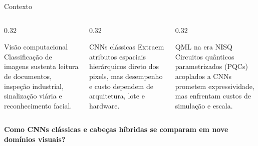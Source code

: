 \documentclass[aspectratio=169,11pt,brazil]{beamer}
\begin{document}
\begin{frame}{Contexto}
  \begin{columns}[T,onlytextwidth]
    \begin{column}{0.32\textwidth}
      \begin{block}{Visão computacional}
        Classificação de imagens sustenta leitura de documentos, inspeção industrial, sinalização viária e reconhecimento facial.
      \end{block}
    \end{column}
    \begin{column}{0.32\textwidth}
      \begin{block}{CNNs clássicas}
        Extraem atributos espaciais hierárquicos direto dos pixels, mas desempenho e custo dependem de arquitetura, lote e hardware.
      \end{block}
    \end{column}
    \begin{column}{0.32\textwidth}
      \begin{block}{QML na era NISQ}
        Circuitos quânticos parametrizados (PQCs) acoplados a CNNs prometem expressividade, mas enfrentam custos de simulação e escala.
      \end{block}
    \end{column}
  \end{columns}
  \vspace{0.5cm}
  \centering
  {\normalsize\bfseries\color{senacblue}Como CNNs clássicas e cabeças híbridas se comparam em nove domínios visuais?}
\end{frame}
\end{document}
